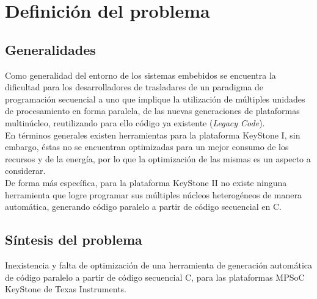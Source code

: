 
\chapter{Definición del problema}
\label{ch:Definicion_del_problema}


\section{Generalidades}

Como generalidad del entorno de los sistemas embebidos se encuentra la dificultad para 
los desarrolladores de trasladares de un paradigma de programación secuencial a uno que 
implique la utilización de múltiples unidades de procesamiento en forma paralela, de las nuevas
generaciones de plataformas multinúcleo, reutilizando para ello código ya existente (\textit{Legacy Code}).\\

En términos generales existen herramientas para la plataforma KeyStone I, sin embargo, éstas
no se encuentran optimizadas para un mejor consumo de los recursos y de la energía, por lo 
que la optimización de las mismas es un aspecto a considerar.\\

De forma más específica, para la plataforma KeyStone II no existe ninguna herramienta que logre
programar sus múltiples núcleos heterogéneos de manera automática, generando código paralelo a 
partir de código secuencial en C.



\section{Síntesis del problema}

Inexistencia y falta de optimización de una herramienta de generación automática 
de código paralelo a partir de código secuencial C, para las plataformas MPSoC KeyStone de Texas Instruments.
